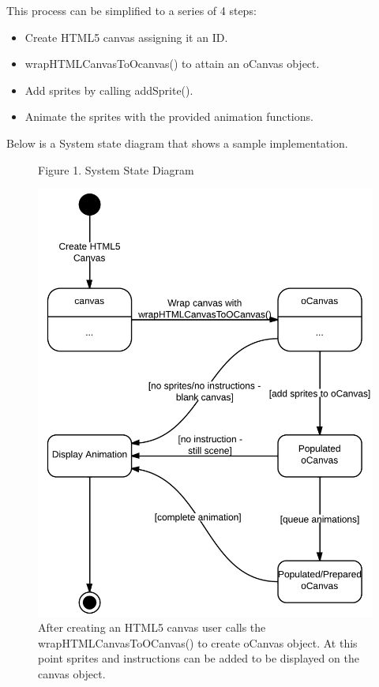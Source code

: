 \documentclass[12pt]{article}
\begin{document}
This process can be simplified to a series of 4 steps:
\begin{itemize}
\item Create HTML5 canvas assigning it an ID.
\item wrapHTMLCanvasToOcanvas() to attain an oCanvas object.
\item Add sprites by calling addSprite().
\item Animate the sprites with the provided animation functions.\\
\end{itemize}

Below is a System state diagram that shows a sample implementation.\\

\begin{figure}
\caption{Figure 1. System State Diagram}
  \centering
    \includegraphics[scale=.3]{animation-statediagram.png}
    \caption*{After creating an HTML5 canvas user calls the wrapHTMLCanvasToOCanvas() to create oCanvas object. At this point sprites and instructions can be added to be displayed on the canvas object.}
\end{figure}
    
\end{document}
